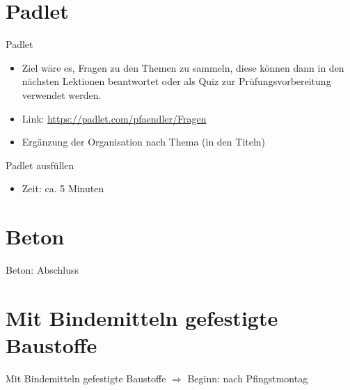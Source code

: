     



\section{Padlet}
\BlueSectionSlide
\begin{frame}{Padlet}
    \begin{itemize}
        \item[\textbullet] Ziel wäre es, Fragen zu den Themen zu sammeln, diese können dann in den nächsten Lektionen beantwortet oder als Quiz zur Prüfungsvorbereitung verwendet werden.
        \item[\textbullet] Link: \url{https://padlet.com/pfaendler/Fragen}
        \item[\textbullet] Ergänzung der Organisation nach Thema (in den Titeln)
    \end{itemize}
\end{frame}


\begin{frame}{Padlet ausfüllen}

    \begin{itemize}
        \item Zeit: ca. 5 Minuten
    \end{itemize}

\end{frame}






\section{Beton}
\BlueSectionSlide
\begin{frame}{Beton: Abschluss}
    
\end{frame}

\section{Mit Bindemitteln gefestigte Baustoffe}
\BlueSectionSlide

\begin{frame}{Mit Bindemitteln gefestigte Baustoffe}
$\Rightarrow$ Beginn: nach Pfingstmontag
    
\end{frame}



